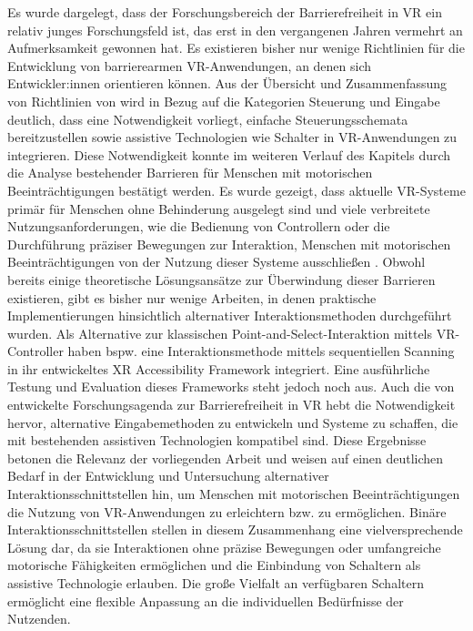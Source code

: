 Es wurde dargelegt, dass der Forschungsbereich der Barrierefreiheit in VR ein relativ junges Forschungsfeld ist, das erst in den vergangenen Jahren vermehrt an Aufmerksamkeit gewonnen hat. Es existieren bisher nur wenige Richtlinien für die Entwicklung von barrierearmen VR-Anwendungen, an denen sich Entwickler:innen orientieren können. Aus der Übersicht und Zusammenfassung von Richtlinien von \citet{heilemann_accessibility_2021} wird in Bezug auf die Kategorien Steuerung und Eingabe deutlich, dass eine Notwendigkeit vorliegt, einfache Steuerungsschemata bereitzustellen sowie assistive Technologien wie Schalter in VR-Anwendungen zu integrieren. Diese Notwendigkeit konnte im weiteren Verlauf des Kapitels durch die Analyse bestehender Barrieren für Menschen mit motorischen Beeinträchtigungen bestätigt werden. Es wurde gezeigt, dass aktuelle VR-Systeme primär für Menschen ohne Behinderung ausgelegt sind \citep{wong_survey_2017} und viele verbreitete Nutzungsanforderungen, wie die Bedienung von Controllern oder die Durchführung präziser Bewegungen zur Interaktion, Menschen mit motorischen Beeinträchtigungen von der Nutzung dieser Systeme ausschließen \citep{10.1007/978-3-030-21607-8_3}. Obwohl bereits einige theoretische Lösungsansätze zur Überwindung dieser Barrieren existieren, gibt es bisher nur wenige Arbeiten, in denen praktische Implementierungen hinsichtlich alternativer Interaktionsmethoden durchgeführt wurden. Als Alternative zur klassischen Point-and-Select-Interaktion mittels VR-Controller haben bspw. \citet{valakou_framework_2024} eine Interaktionsmethode mittels sequentiellen Scanning in ihr entwickeltes XR Accessibility Framework integriert. Eine ausführliche Testung und Evaluation dieses Frameworks steht jedoch noch aus. Auch die von \citet{creed_inclusive_2024_2} entwickelte Forschungsagenda zur Barrierefreiheit in VR hebt die Notwendigkeit hervor, alternative Eingabemethoden zu entwickeln und Systeme zu schaffen, die mit bestehenden assistiven Technologien kompatibel sind.
Diese Ergebnisse betonen die Relevanz der vorliegenden Arbeit und weisen auf einen deutlichen Bedarf in der Entwicklung und Untersuchung alternativer Interaktionsschnittstellen hin, um Menschen mit motorischen Beeinträchtigungen die Nutzung von VR-Anwendungen zu erleichtern bzw. zu ermöglichen. Binäre Interaktionsschnittstellen stellen in diesem Zusammenhang eine vielversprechende Lösung dar, da sie Interaktionen ohne präzise Bewegungen oder umfangreiche motorische Fähigkeiten ermöglichen und die Einbindung von Schaltern als assistive Technologie erlauben. Die große Vielfalt an verfügbaren Schaltern ermöglicht eine flexible Anpassung an die individuellen Bedürfnisse der Nutzenden. 

